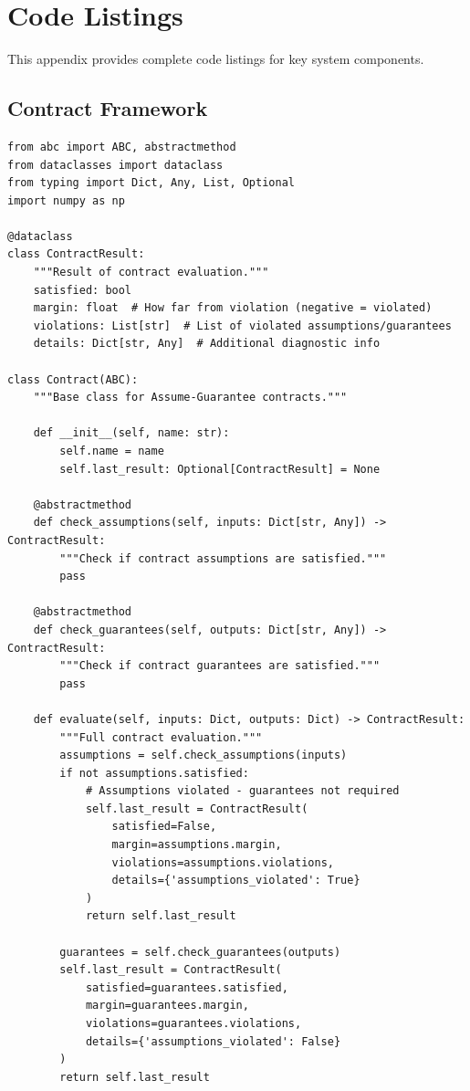 
\chapter{Code Listings}
\label{app:code}

This appendix provides complete code listings for key system components.

\section{Contract Framework}

\begin{lstlisting}[caption={Base contract class (contract\_framework.py)}, label=lst:base_contract]
from abc import ABC, abstractmethod
from dataclasses import dataclass
from typing import Dict, Any, List, Optional
import numpy as np

@dataclass
class ContractResult:
    """Result of contract evaluation."""
    satisfied: bool
    margin: float  # How far from violation (negative = violated)
    violations: List[str]  # List of violated assumptions/guarantees
    details: Dict[str, Any]  # Additional diagnostic info

class Contract(ABC):
    """Base class for Assume-Guarantee contracts."""

    def __init__(self, name: str):
        self.name = name
        self.last_result: Optional[ContractResult] = None

    @abstractmethod
    def check_assumptions(self, inputs: Dict[str, Any]) -> ContractResult:
        """Check if contract assumptions are satisfied."""
        pass

    @abstractmethod
    def check_guarantees(self, outputs: Dict[str, Any]) -> ContractResult:
        """Check if contract guarantees are satisfied."""
        pass

    def evaluate(self, inputs: Dict, outputs: Dict) -> ContractResult:
        """Full contract evaluation."""
        assumptions = self.check_assumptions(inputs)
        if not assumptions.satisfied:
            # Assumptions violated - guarantees not required
            self.last_result = ContractResult(
                satisfied=False,
                margin=assumptions.margin,
                violations=assumptions.violations,
                details={'assumptions_violated': True}
            )
            return self.last_result

        guarantees = self.check_guarantees(outputs)
        self.last_result = ContractResult(
            satisfied=guarantees.satisfied,
            margin=guarantees.margin,
            violations=guarantees.violations,
            details={'assumptions_violated': False}
        )
        return self.last_result
\end{lstlisting}

